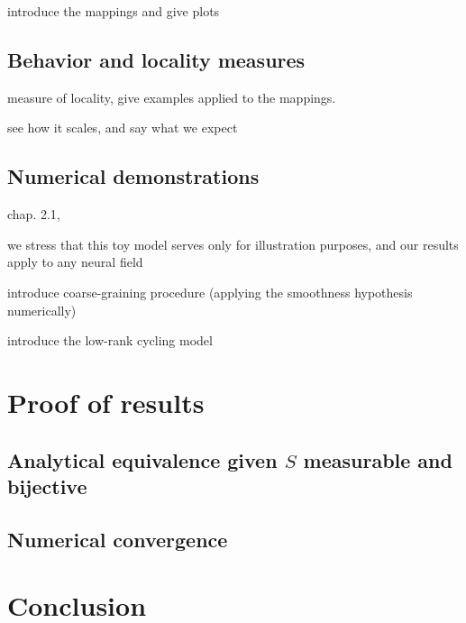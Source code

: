\documentclass[NETN,manuscript]{stjour-new}
\begin{document}
introduce the mappings and give plots

\subsection{Behavior and locality measures}

measure of locality, give examples applied to the mappings.

see how it scales, and say what we expect

\subsection{Numerical demonstrations}

chap. 2.1, 

we stress that this toy model serves only for illustration purposes, and our results apply to any neural field

introduce coarse-graining procedure (applying the smoothness hypothesis numerically)

introduce the low-rank cycling model

\section{Proof of results}

\subsection{Analytical equivalence given $S$ measurable and bijective}
\label{sec:proof-equivalence}

\subsection{Numerical convergence}

\section{Conclusion}

\acknowledgments


% 
\end{document}
